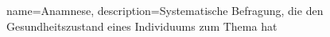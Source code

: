 \makeglossaries
 
{
    name=Anamnese,
    description={Systematische Befragung, die den Gesundheitszustand eines Individuums zum Thema hat}
}
